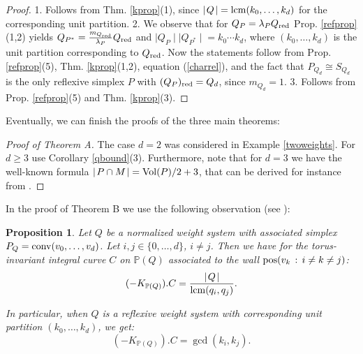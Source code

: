 \documentclass[a4paper,twoside]{article}
\newcommand{\card}[1]{{\mid\! #1 \!\mid}}
\def\P{{\mathbb P}}
\def\Qred{{Q_{\rm red}}}
\def\red{{\rm red}}
\def\lcm{{\rm lcm}}
\def\conv{{\rm conv}}
\def\pos{{\rm pos}}
\def\vol{{\rm Vol}}
\newtheorem{proposition}[theorem]{Proposition}
\begin{document}
\begin{proof}

1. Follows from Thm. \ref{kprop}(1), since $\card{Q} = \lcm(k_0, \ldots, k_d)$ for 
the corresponding unit partition. 2. We observe that for $Q_P = \lambda_P \Qred$ 
Prop. \ref{refprop}(1,2) yields $Q_{P^*} = \frac{m_\Qred}{\lambda_P} \Qred$ and $\card{Q_P} \card{Q_{P^*}} = k_0 \cdots k_d$, where $(k_0, \ldots, k_d)$ 
is the unit partition corresponding to $\Qred$. Now the statements follow from Prop. \ref{refprop}(5), Thm. \ref{kprop}(1,2), equation (\ref{charrel}), and the fact that 
$P_{Q_d} \cong S_{Q_d}$ is the only reflexive simplex $P$ with $(Q_P)_\red = Q_d$, since $m_{Q_d} = 1$. 
3. Follows from Prop. \ref{refprop}(5) and Thm. \ref{kprop}(3). 

\end{proof}

Eventually, we can finish the proofs of the three main theorems:

\begin{proof}[Proof of Theorem A]

The case $d=2$ was considered in Example \ref{twoweights}. For $d \geq 3$ use Corollary \ref{qbound}(3). 
Furthermore, note that for $d=3$ we have the well-known formula $ \card{P \cap M} = \vol(P)/2 + 3$, that can be 
derived for instance from \cite{Hib92}.

\end{proof}

In the proof of Theorem B we use the following observation (see \cite[2.2]{Fuj03}):

\begin{proposition}
Let $Q$ be a normalized weight system with associated simplex 
$P_Q = \conv(v_0, \ldots, v_d)$. 
Let $i,j \in \{0, \ldots, d\}$, $i \not= j$. 
Then we have for 
the torus-invariant integral curve $C$ on $\P(Q)$ associated to the wall $\pos(v_k \,:\, i \not= k \not=j)$:
\[(-K_{\P(Q)}).C = \frac{\card{Q}}{\lcm(q_i,q_j)}.\]

In particular, when $Q$ is a reflexive weight system with corresponding unit partition $(k_0, \ldots, k_d)$, 
we get:
\[(-K_{\P(Q)}).C = \gcd(k_i,k_j).\]
\label{fujino}
\end{proposition}
\end{document}
